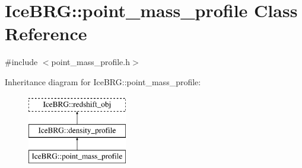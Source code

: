 \hypertarget{classIceBRG_1_1point__mass__profile}{}\section{Ice\+B\+R\+G\+:\+:point\+\_\+mass\+\_\+profile Class Reference}
\label{classIceBRG_1_1point__mass__profile}


{\ttfamily \#include $<$point\+\_\+mass\+\_\+profile.\+h$>$}

Inheritance diagram for Ice\+B\+R\+G\+:\+:point\+\_\+mass\+\_\+profile\+:\begin{figure}[H]
\begin{center}
\leavevmode
\includegraphics[height=3.000000cm]{classIceBRG_1_1point__mass__profile}
\end{center}
\end{figure}
